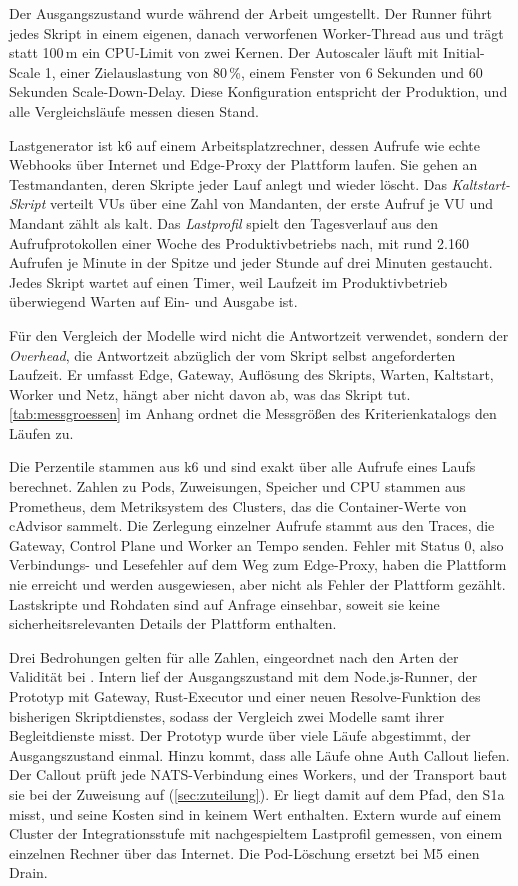 Der Ausgangszustand wurde während der Arbeit umgestellt. Der Runner führt jedes Skript
in einem eigenen, danach verworfenen Worker-Thread aus und trägt statt 100\,m ein
\ac{CPU}-Limit von zwei Kernen. Der Autoscaler läuft mit Initial-Scale 1, einer Zielauslastung von 80\,\%, einem Fenster
von 6 Sekunden und 60 Sekunden Scale-Down-Delay. Diese Konfiguration entspricht der Produktion, und alle Vergleichsläufe messen
diesen Stand.

Lastgenerator ist k6 \autocite{grafana_labs_k6_2026} auf einem Arbeitsplatzrechner, dessen Aufrufe wie echte
Webhooks über Internet und Edge-Proxy der Plattform laufen. Sie gehen an Testmandanten, deren Skripte jeder Lauf
anlegt und wieder löscht. Das \emph{Kaltstart-Skript} verteilt \acp{VU} über eine Zahl von Mandanten, der erste
Aufruf je \ac{VU} und Mandant zählt als kalt. Das \emph{Lastprofil} spielt den Tagesverlauf aus den
Aufrufprotokollen einer Woche des Produktivbetriebs nach, mit rund 2.160 Aufrufen je Minute in der Spitze und jeder
Stunde auf drei Minuten gestaucht. Jedes Skript wartet auf einen Timer, weil Laufzeit im Produktivbetrieb überwiegend
Warten auf Ein- und Ausgabe ist.

Für den Vergleich der Modelle wird nicht die Antwortzeit verwendet, sondern der
\emph{Overhead}, die Antwortzeit abzüglich der vom Skript selbst angeforderten Laufzeit. Er umfasst
Edge, Gateway, Auflösung des Skripts, Warten, Kaltstart, Worker und Netz, hängt aber nicht davon
ab, was das Skript tut. \autoref{tab:messgroessen} im Anhang ordnet die Messgrößen des Kriterienkatalogs den Läufen
zu.



Die Perzentile stammen aus k6 und sind exakt über alle Aufrufe eines Laufs berechnet. Zahlen zu Pods, Zuweisungen,
Speicher und \ac{CPU} stammen aus Prometheus, dem Metriksystem des Clusters, das die Container-Werte von cAdvisor
sammelt. Die Zerlegung einzelner Aufrufe stammt aus den Traces, die Gateway, Control Plane und Worker an Tempo senden. Fehler mit Status 0, also
Verbindungs- und Lesefehler auf dem Weg zum Edge-Proxy, haben die Plattform nie erreicht und werden ausgewiesen,
aber nicht als Fehler der Plattform gezählt. Lastskripte und Rohdaten sind auf Anfrage einsehbar, soweit sie keine
sicherheitsrelevanten Details der Plattform enthalten.

Drei Bedrohungen gelten für alle Zahlen, eingeordnet nach den Arten der Validität bei \textcite[S.~129--130]{wohlin_experimentation_2024}. Intern lief der Ausgangszustand mit dem Node.js-Runner, der
Prototyp mit Gateway, Rust-Executor und einer neuen Resolve-Funktion des bisherigen Skriptdienstes, sodass der
Vergleich zwei Modelle samt ihrer Begleitdienste misst. Der Prototyp wurde über viele Läufe abgestimmt, der Ausgangszustand
einmal. Hinzu kommt, dass alle Läufe ohne Auth Callout liefen. Der Callout prüft jede NATS-Verbindung eines Workers, und
der Transport baut sie bei der Zuweisung auf (\autoref{sec:zuteilung}). Er liegt damit auf dem Pfad, den S1a misst, und
seine Kosten sind in keinem Wert enthalten. Extern wurde auf einem Cluster der Integrationsstufe mit nachgespieltem Lastprofil gemessen, von einem einzelnen
Rechner über das Internet. Die Pod-Löschung ersetzt bei M5 einen Drain.

